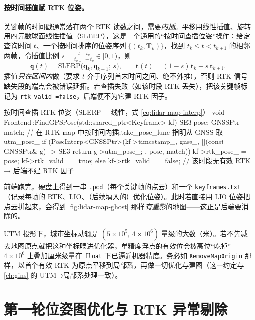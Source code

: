 \paragraph{按时间插值赋 RTK 位姿。}
关键帧的时间戳通常落在两个 RTK 读数之间，需要\emph{内插}。平移用线性插值、旋转用四元数球面线性插值（SLERP），这是一个通用的“按时间查插位姿”操作：给定查询时间 $t$、一个按时间排序的位姿序列 $\{(t_k,\mathbf{T}_k)\}$，找到 $t_k\le t< t_{k+1}$ 的相邻两帧，令插值比例 $s=\frac{t-t_k}{t_{k+1}-t_k}\in[0,1)$，则
\begin{equation}
\label{eq:lidar-map-interp}
\mathbf{q}(t)=\mathrm{SLERP}\big(\mathbf{q}_k,\mathbf{q}_{k+1};\,s\big),\qquad
\mathbf{t}(t)=(1-s)\,\mathbf{t}_k+s\,\mathbf{t}_{k+1}.
\end{equation}
插值\emph{只在区间内}做（要求 $t$ 介于序列首末时间之间、绝不外推），否则 RTK 信号缺失段的端点会被错误延拓。若查插失败（如该时段 RTK 丢失），把该关键帧标记为 \texttt{rtk\_valid\_=false}，后端便不为它建 RTK 因子。

\begin{codebox}[C++]{按时间查插 RTK 位姿（SLERP + 线性，式 \ref{eq:lidar-map-interp}）}
void Frontend::FindGPSPose(std::shared_ptr<Keyframe> kf) {
  SE3 pose; GNSSPtr match;
  // 在 RTK map 中按时间内插;take_pose_func 指明从 GNSS 取 utm_pose_
  if (PoseInterp<GNSSPtr>(kf->timestamp_, gnss_,
        [](const GNSSPtr& g) -> SE3 { return g->utm_pose_; }, pose, match)) {
    kf->rtk_pose_  = pose;
    kf->rtk_valid_ = true;
  } else {
    kf->rtk_valid_ = false;   // 该时段无有效 RTK → 后端不建 RTK 因子
  }
}
\end{codebox}

前端跑完，硬盘上得到一串 \texttt{.pcd}（每个关键帧的点云）和一个 \texttt{keyframes.\allowbreak txt}（记录每帧的 RTK、LIO、（后续填入的）优化位姿）。此时若直接用 LIO 位姿把点云拼起来，会得到 \cref{fig:lidar-map-ghost} 那样\emph{有重影}的地图——这正是后端要消除的。

\begin{pitfall}
UTM 投影下，城市坐标动辄是 $(5\times10^5,\ 4\times10^6)$ 量级的大数（米）。若不先减去地图原点就把这种坐标喂进优化器，单精度浮点的有效位会被高位“吃掉”——$4\times10^6$ 上叠加厘米级量在 \texttt{float} 下已逼近机器精度。务必如 \texttt{RemoveMapOrigin} 那样，以首个有效 RTK 为原点平移到局部系，再做一切优化与建图（这一约定与 \cref{ch:gins} 的 UTM→局部系处理一致）。
\end{pitfall}

\section{第一轮位姿图优化与 RTK 异常剔除}
\label{sec:lidar-map-pgo1}

